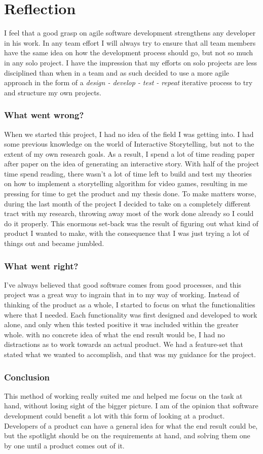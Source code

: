 \chapter{Reflection}
I feel that a good grasp on agile software development strengthens any developer in his work.
In any team effort I will always try to ensure that all team members have the same idea on how the development process should go, but not so much in any solo project.
I have the impression that my efforts on solo projects are less disciplined than when in a team and as such decided to use a more agile approach in the form of a \textit{design - develop - test - repeat} iterative process to try and structure my own projects.
\subsection*{What went wrong?}
When we started this project, I had no idea of the field I was getting into. 
I had some previous knowledge on the world of Interactive Storytelling, but not to the extent of my own research goals.
As a result, I spend a lot of time reading paper after paper on the idea of generating an interactive story.
With half of the project time spend reading, there wasn't a lot of time left to build and test my theories on how to implement a storytelling algorithm for video games, resulting in me pressing for time to get the product and my thesis done.
To make matters worse, during the last month of the project I decided to take on a completely different tract with my research, throwing away most of the work done already so I could do it properly.
This enormous set-back was the result of figuring out what kind of product I wanted to make, with the consequence that I was just trying a lot of things out and became jumbled.
\subsection*{What went right?}
I've always believed that good software comes from good processes, and this project was a great way to ingrain that in to my way of working. 
Instead of thinking of the product as a whole, I started to focus on what the functionalities where that I needed.
Each functionality was first designed and developed to work alone, and only when this tested positive it was included within the greater whole.
with no concrete idea of what the end result would be, I had no distractions as to work towards an actual product.
We had a feature-set that stated what we wanted to accomplish, and that was my guidance for the project.
\subsection*{Conclusion}
This method of working really suited me and helped me focus on the task at hand, without losing sight of the bigger picture.
I am of the opinion that software development could benefit a lot with this form of looking at a product.
Developers of a product can have a general idea for what the end result could be, but the spotlight should be on the requirements at hand, and solving them one by one until a product comes out of it. 